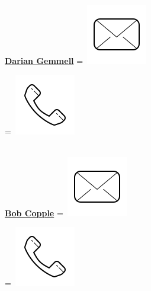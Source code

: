 \documentclass[]{latex/resume}
\begin{document}
\begin{minipage}[t]{0.25\textwidth}
    \sectionsep
    
    \href{https://www.linkedin.com}{\textbf{Darian Gemmell}} 
    \begingroup
        =\hbox{
            \includegraphics[scale=0.1,trim={0 1cm 0cm 0cm}]{latex/icons/mail.png} 
        }
        \parbox{\wd0}{}
    \endgroup
    \begingroup
        =\hbox{ \includegraphics[scale=0.1,trim={0 1.25cm -0.4cm 0cm}]{latex/icons/phone.png}\hspace{0.2cm} }
        \parbox{\wd0}{}
    \endgroup \\

    \href{https://www.linkedin.com/in/bob-copple-8804a713/}{\textbf{Bob Copple}} 
    \begingroup
        =\hbox{
            \includegraphics[scale=0.1,trim={0 1cm 0cm 0cm}]{latex/icons/mail.png} 
        }
        \parbox{\wd0}{}
    \endgroup
    \begingroup
        =\hbox{ \includegraphics[scale=0.1,trim={0 1.25cm -0.4cm 0cm}]{latex/icons/phone.png}\hspace{0.2cm} }
        \parbox{\wd0}{}
    \endgroup \\


\end{minipage}
\end{document}
